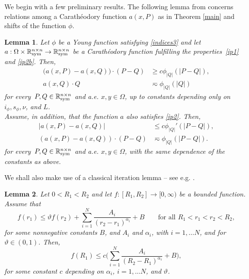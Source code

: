 \documentclass[leqno,11pt]{amsart}%
\numberwithin{equation}{section}
\def\real{\mathbb R}
\def\Sym{\real^{n\times n}_{\textup{sym}}}
\theoremstyle{definition}
\newtheorem{lemalph}{Lemma}
\numberwithin{equation}{section}
\begin{document}
We begin with a few preliminary results.
The following lemma   from \cites{DieForTomWan19, GPS} concerns relations among a Carath\'eodory function $a(x,P)$ as in Theorem \ref{main}
and shifts of the function $\phi$.

\begin{lemalph}
  \label{lem:hammer}
  \textit{
  Let $\phi$ be a Young function satisfying \eqref{indices3} and let $a:\Omega\times\Sym\to\Sym$ be a Carath\'eodory function fulfilling the
properties~\eqref{ip1} and \eqref{ip2b}.
  Then, 
  \begin{align}\label{a-coercivity}
   \big( a(x,P)-a(x,Q)\big)\cdot (P-Q )
    &\geq c  \phi_{|{Q}|} \left( |{P-Q}| \right) 
    ,\\[0.8ex]
    \label{seconda}
    a(x,Q) \cdot Q
    &  \eqsim  \phi_{|{Q}|}(|{Q}|) 
  \end{align}
  for every~$P,Q \in \Sym$ and a.e. $x,y\in\Omega $, up to 
  constants  depending only on $i_\phi,s_\phi,\nu$, and $L$.
\\  Assume, in addition, that the function $a$ also satisfies \eqref{ip2}. Then, 
  \begin{align}
    \label{a-Lipschitz}
    |{a(x,P)-a(x,Q)}| &\le c \phi_{|{Q}|}'(|{P-Q}|),\\
     (a(x,P)-a(x,Q))\cdot (P-Q)
    &\eqsim \phi_{|{Q}|} \left( |{P-Q}| \right).\label{a-coercivity-2}
  \end{align}
  for every~$P,Q \in \Sym$ and a.e. $x,y\in\Omega $, with the same dependence of the constants as above.}
\end{lemalph}
We shall also make use of a classical iteration lemma -- see e.g. \cite[Lemma 6.1]{Giusti}.
\begin{lemalph}\label{lem:Giaq}
\textit{    Let $0<R_1<R_2$ and let   
    $f:[R_1,R_2]\to[0,\infty)$ be a bounded function. Assume that 
\begin{equation*}
      f(r_1)\le\vartheta f(r_2)+\sum_{i=1}^N\frac {A_i}{(r_2-r_1)^{\alpha_i}} + B
       \qquad\mbox{for all }R_1<r_1<r_2<R_2,
    \end{equation*}
    for some nonnegative constants $B$, and $A_i$ and $\alpha_i$, with $i=1, \dots N$,
    and for $\vartheta\in(0,1)$. Then, 
    \begin{equation*}
      f(R_1)\le c
      \bigg(\sum_{i=1}^N\frac {A_i}{(R_2-R_1)^{\alpha_i}} + B
      \bigg),
    \end{equation*}
    for some constant $c$ depending on $\alpha_i$, $i=1, \dots N$,
 and $\vartheta$.   }
  \end{lemalph}
\end{document}
